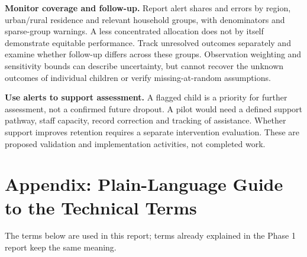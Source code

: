 \documentclass[conference,a4paper]{IEEEtran}
\begin{document}
\textbf{Monitor coverage and follow-up.} Report alert shares and errors by region, urban/rural residence and relevant household groups, with denominators and sparse-group warnings. A less concentrated allocation does not by itself demonstrate equitable performance. Track unresolved outcomes separately and examine whether follow-up differs across these groups. Observation weighting and sensitivity bounds can describe uncertainty, but cannot recover the unknown outcomes of individual children or verify missing-at-random assumptions.

\textbf{Use alerts to support assessment.} A flagged child is a priority for further assessment, not a confirmed future dropout. A pilot would need a defined support pathway, staff capacity, record correction and tracking of assistance. Whether support improves retention requires a separate intervention evaluation. These are proposed validation and implementation activities, not completed work.

\clearpage
\section*{\textbf{Appendix: Plain-Language Guide to the Technical Terms}}
The terms below are used in this report; terms already explained in the Phase 1 report keep the same meaning.
\end{document}
